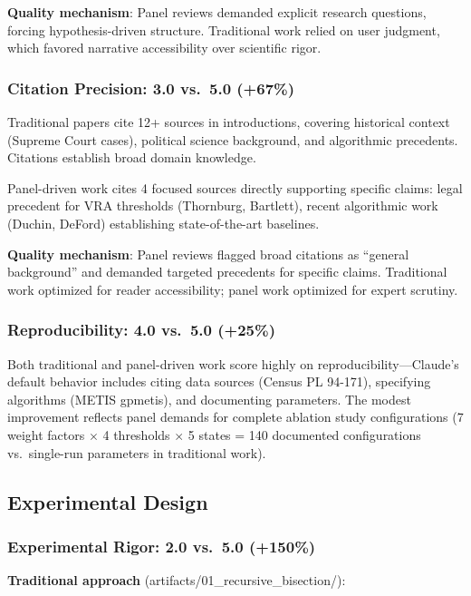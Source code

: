\textbf{Quality mechanism}: Panel reviews demanded explicit research questions, forcing hypothesis-driven structure. Traditional work relied on user judgment, which favored narrative accessibility over scientific rigor.

\subsubsection{Citation Precision: 3.0 vs.\ 5.0 (+67\%)}

Traditional papers cite 12+ sources in introductions, covering historical context (Supreme Court cases), political science background, and algorithmic precedents. Citations establish broad domain knowledge.

Panel-driven work cites 4 focused sources directly supporting specific claims: legal precedent for VRA thresholds (Thornburg, Bartlett), recent algorithmic work (Duchin, DeFord) establishing state-of-the-art baselines.

\textbf{Quality mechanism}: Panel reviews flagged broad citations as ``general background'' and demanded targeted precedents for specific claims. Traditional work optimized for reader accessibility; panel work optimized for expert scrutiny.

\subsubsection{Reproducibility: 4.0 vs.\ 5.0 (+25\%)}

Both traditional and panel-driven work score highly on reproducibility---Claude's default behavior includes citing data sources (Census PL 94-171), specifying algorithms (METIS gpmetis), and documenting parameters. The modest improvement reflects panel demands for complete ablation study configurations (7 weight factors $\times$ 4 thresholds $\times$ 5 states = 140 documented configurations vs.\ single-run parameters in traditional work).

\subsection{Experimental Design}

\subsubsection{Experimental Rigor: 2.0 vs.\ 5.0 (+150\%)}

\textbf{Traditional approach} (artifacts/01\_recursive\_bisection/):

